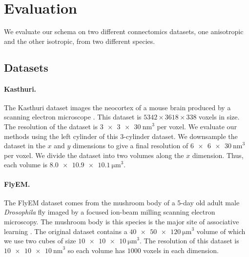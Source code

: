\section{Evaluation}

We evaluate our schema on two different connectomics datasets, one anisotropic and the other isotropic, from two different species. 

\subsection{Datasets}
\label{sec:dataset}
\paragraph{Kasthuri.}
The Kasthuri dataset images the neocortex of a mouse brain produced by a scanning electron microscope \cite{kasthuri2015saturated}. 
This dataset is $5342 \times 3618 \times 338$ voxels in size. 
The resolution of the dataset is $\SI[product-units=single]{3 x 3 x 30}{\nano\meter}^3$ per voxel. 
We evaluate our methods using the left cylinder of this 3-cylinder dataset. 
We downsample the dataset in the $x$ and $y$ dimensions to give a final resolution of $\SI[product-units=single]{6 x 6 x 30}{\nano\meter}^3$ per voxel. 
We divide the dataset into two volumes along the $x$ dimension.
Thus, each volume is $\SI[product-units=single]{8.0 x 10.9 x 10.1}{\micro\meter}^3$. 

\paragraph{FlyEM.}
The FlyEM dataset comes from the mushroom body of a 5-day old adult male \textit{Drosophila} fly imaged by a focused ion-beam milling scanning electron microscopy.  
The mushroom body is this species is the major site of associative learning \cite{takemura2017connectome}. 
The original dataset contains a $\SI[product-units=single]{40 x 50 x 120}{\micro\meter}^3$ volume of which we use two cubes of size $\SI[product-units=single]{10 x 10 x 10}{\micro\meter}^3$. 
The resolution of this dataset is $\SI[product-units=single]{10 x 10 x 10}{\nano\meter}^3$ so each volume has $1000$ voxels in each dimension.

